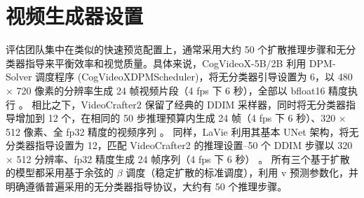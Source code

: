 \section{视频生成器设置}
评估团队集中在类似的快速预览配置上，通常采用大约 50 个扩散推理步骤和无分类器指导来平衡效率和视觉质量。具体来说，CogVideoX-5B/2B 利用 DPM-Solver 调度程序 (CogVideoXDPMScheduler)，将无分类器引导设置为 6，以 480 × 720 像素的分辨率生成 24 帧视频片段（4 fps 下 6 秒），全部以 bfloat16 精度执行 \cite{yang2024cogvideox}。
相比之下，VideoCrafter2 保留了经典的 DDIM 采样器，同时将无分类器指导增加到 12 个，在相同的 50 步推理预算内生成 24 帧（4 fps 下 6 秒）、320 × 512 像素、全 fp32 精度的视频序列 \cite{wang2023lavie}。
同样，LaVie 利用其基本 UNet 架构，将无分类器指导设置为 12，匹配 VideoCrafter2 的推理设置--50 个 DDIM 步骤以 320 × 512 分辨率、fp32 精度生成 24 帧序列（4 fps 下 6 秒） \cite{chen2024videocrafter2}。
所有三个基于扩散的模型都采用基于余弦的 $\beta$ 调度（稳定扩散的标准调度），利用 v 预测参数化，并明确遵循普遍采用的无分类器指导协议，大约有 50 个推理步骤。

